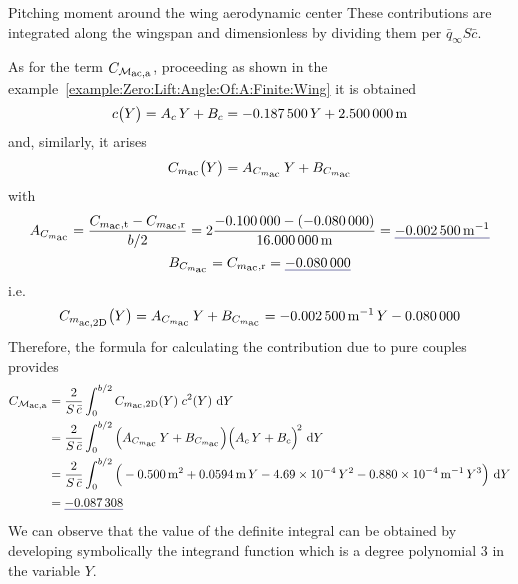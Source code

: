 \documentclass[[12pt,twoside]{book}
\begin{document}
\begin{myExampleX}{Pitching moment around the wing aerodynamic center}{}
\noindent
These contributions are integrated along the wingspan and dimensionless by dividing them
per $\bar{q}_\infty S \bar{c}$.

As for the term $C_{\mathcal{M}_\mathlarger{\mathrm{ac,a}}}$,
proceeding as shown in the example~\ref{example:Zero:Lift:Angle:Of:A:Finite:Wing}
it is obtained
\[
c \big( Y \big) = A_c \, Y + B_c
  = \SI[round-precision=3]{\myCoeffAChordWing}{} \, Y
    + \SI[round-precision=2]{\myCoeffBChordWingMT}{\metre}
\]
and, similarly, it arises
\[
C_{m_\mathlarger{\mathrm{ac}}} \big( Y \big) 
  = A_{C_{m_\mathlarger{\mathrm{ac}}}} \, Y + B_{C_{m_\mathlarger{\mathrm{ac}}}}
\]
with
\[
A_{C_{m_\mathlarger{\mathrm{ac}}}}
  = \frac{C_{m_\mathlarger{\mathrm{ac}},\mathrm{t}} 
    - C_{m_\mathlarger{\mathrm{ac}},\mathrm{r}}}{b/2}
  = 
    2 \frac{
      \SI[round-precision=3]{\myCmZeroTipWing}{} 
      - ( \SI[round-precision=3]{\myCmZeroRootWing}{} )
    }{
      \SI[round-precision=2]{\mySpanWingMT}{\metre}
    }
  = 
    \mathunderline{mydarkblue}{ 
      \SI[round-precision=5]{\myCoeffACmZeroWingMT}{\metre^{-1}} 
    }
\]
\[
B_{C_{m_\mathlarger{\mathrm{ac}}}}
  = C_{m_\mathlarger{\mathrm{ac}},\mathrm{r}}
  = \mathunderline{mydarkblue}{ \SI[round-precision=3]{\myCoeffBCmZeroWing}{} }
\]
i.e.
\[
C_{m_\mathlarger{\mathrm{ac,2D}}} \big( Y \big) 
  = A_{C_{m_\mathlarger{\mathrm{ac}}}} \, Y + B_{C_{m_\mathlarger{\mathrm{ac}}}}
  = \SI[round-precision=5]{\myCoeffACmZeroWingMT}{\metre^{-1}} \, Y
    \SI[round-precision=3]{\myCoeffBCmZeroWing}{}
\]
%
Therefore, the formula for calculating the contribution due to pure couples provides
\[
\begin{split}
C_{\mathcal{M}_\mathlarger{\mathrm{ac,a}}}
  & {}= \frac{2}{S\,\bar{c}} \int_0^{b/2} 
    C_{m_\mathlarger{\mathrm{ac}},\mathrm{2D}}(Y) \; c^2(Y)\, \diff{Y}
\\
  & {}= 
  \frac{2}{S\,\bar{c}} \int_0^{b/2} 
    \Big( 
      A_{C_{m_\mathlarger{\mathrm{ac}}}} \, Y + B_{C_{m_\mathlarger{\mathrm{ac}}}} 
    \Big)
    \Big( A_c \, Y + B_c \Big)^{\! 2}
    \, \diff{Y}
\\
  & {}= 
  \frac{2}{S\,\bar{c}} \int_0^{b/2} 
    \Big( 
      \SI[round-mode=figures,round-precision=3,
        fixed-exponent=0,scientific-notation=fixed]{\myCoeffAWing}{\metre^2}
      + 
      \SI[round-mode=figures,round-precision=3,
        ]{\myCoeffBWing}{\metre}\, Y
      \SI[round-mode=figures,round-precision=3,
        fixed-exponent=-4,
        scientific-notation=fixed %
        ]{\myCoeffCWing}{}\, Y^2
      \SI[round-mode=figures,round-precision=3,
        fixed-exponent=-4,
        scientific-notation=fixed
        ]{\myCoeffDWing}{\metre^{-1}}\, Y^3
    \Big)
    \, \diff{Y}
\\
  & {}= \mathunderline{mydarkblue}{ \SI[round-precision=4]{\myCmZeroAWing}{} }
\end{split}
\]
We can observe that the value of the definite integral can be obtained by developing symbolically
the integrand function which is a degree polynomial $3$ in the variable $Y$.


\end{myExampleX}
\end{document}

